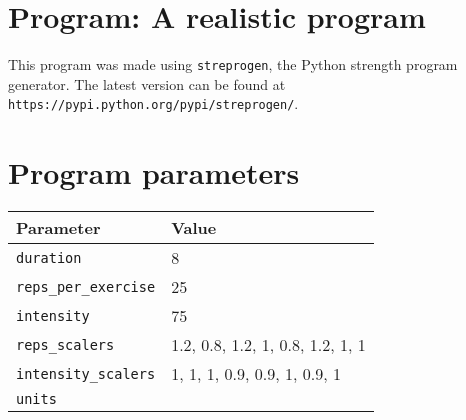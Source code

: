 \documentclass[12pt, a4paper]{article}%
\begin{document}
\large

\section*{Program: A realistic program}

This program was made using \verb|streprogen|,
the Python strength program generator.
The latest version can be found at \\
\verb|https://pypi.python.org/pypi/streprogen/|.


\section*{Program parameters}
\begin{tabular}{l|l}
	\textbf{Parameter} & \textbf{Value} \\ \hline
	\verb|duration|             & 8 \\
	\verb|reps_per_exercise|    & 25 \\
	\verb|intensity|        & 75 \\
	\verb|reps_scalers|         & 1.2, 0.8, 1.2, 1, 0.8, 1.2, 1, 1 \\
	\verb|intensity_scalers|    & 1, 1, 1, 0.9, 0.9, 1, 0.9, 1 \\
	\verb|units|                & 
\end{tabular}
\end{document}
